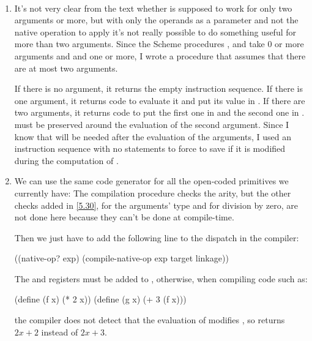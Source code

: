 \begin{exe}[5.38]
    \ \vspace{-20pt}
    \begin{enumerate}
	\item It’s not very clear from the text whether  
	    is supposed to work for only two arguments or more, but with only 
	    the operands as a parameter and not the native operation to apply 
	    it’s not really possible to do something useful for more than two 
	    arguments. Since the Scheme procedures \vscm{=}, \vscm{+} and 
	    \vscm{*} take 0 or more arguments and \vscm{-} and \vscm{/} one or 
	    more, I wrote a procedure that assumes that there are at most two 
	    arguments.

	    If there is no argument, it returns the empty instruction sequence.
	    If there is one argument, it returns code to evaluate it and put its 
	    value in .
	    If there are two arguments, it returns code to put the first one in 
	     and the second one in .  must be 
	    preserved around the evaluation of the second argument. Since I know 
	    that  will be needed after the evaluation of the 
	    arguments, I used an instruction sequence with no statements to 
	    force  to save  if it is modified during 
	    the computation of .

	\item We can use the same code generator for all the open-coded 
	    primitives we currently have:
	    The compilation procedure checks the arity, but the other checks 
	    added in \autoref{5.30}, for the arguments’ type and for division by 
	    zero, are not done here because they can’t be done at compile-time.

	    Then we just have to add the following line to the dispatch in the 
	    compiler:
	    \begin{cscm}
		((native-op? exp) (compile-native-op exp target linkage))
	    \end{cscm}

	    The  and  registers must be added to 
	    , otherwise, when compiling code such as:
	    \begin{cscm}
		(define (f x) (* 2 x))
		(define (g x) (+ 3 (f x)))
	    \end{cscm}
	    the compiler does not detect that the evaluation of  
	    modifies , so  returns $2x + 2$ instead of
	    $2x + 3$.


\end{enumerate}
\end{exe}
